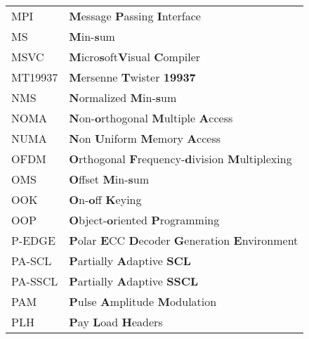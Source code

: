 \begin{center}
\begin{longtable}{ p{}  p{} }
		MPI     & \textbf{M}essage \textbf{P}assing \textbf{I}nterface                                                            \\
		MS      & \textbf{M}in-\textbf{s}um                                                                                       \\
		MSVC    & \textbf{M}icro\textbf{s}oft\R \textbf{V}isual \textbf{C}ompiler                                                 \\
		MT19937 & \textbf{M}ersenne \textbf{T}wister \textbf{19937}                                                               \\
		NMS     & \textbf{N}ormalized \textbf{M}in-\textbf{s}um                                                                   \\
		NOMA    & \textbf{N}on-\textbf{o}rthogonal \textbf{M}ultiple \textbf{A}ccess                                              \\
		NUMA    & \textbf{N}on \textbf{U}niform \textbf{M}emory \textbf{A}ccess                                                   \\
		OFDM    & \textbf{O}rthogonal \textbf{F}requency-\textbf{d}ivision \textbf{M}ultiplexing                                  \\
		OMS     & \textbf{O}ffset \textbf{M}in-\textbf{s}um                                                                       \\
		OOK     & \textbf{O}n-\textbf{o}ff \textbf{K}eying                                                                        \\
		OOP     & \textbf{O}bject-\textbf{o}riented \textbf{P}rogramming                                                          \\
		P-EDGE  & \textbf{P}olar \textbf{E}CC \textbf{D}ecoder \textbf{G}eneration \textbf{E}nvironment                           \\
		PA-SCL  & \textbf{P}artially \textbf{A}daptive \textbf{SCL}                                                               \\
		PA-SSCL & \textbf{P}artially \textbf{A}daptive \textbf{SSCL}                                                              \\
		PAM     & \textbf{P}ulse \textbf{A}mplitude \textbf{M}odulation                                                           \\
		PLH     & \textbf{P}ay \textbf{L}oad \textbf{H}eaders                                                                     \\

\end{longtable}
\end{center}
